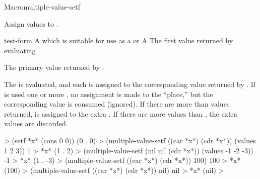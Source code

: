 \documentclass[10pt,twoside,english,pdftex]{article}
\begin{document}

\begin{functiondoc}{Macro}{multiple-value-setf}{%
 }
  
\fnsyntax

\fnpurpose Assign values to .

\fnpackage {}

\fnmodule {}

\fnargs
\begin{args}{test-form}
\arg[place] A  which is suitable for use as a
   or \nil 
\arg[form] A 
 The first value returned by evaluating 
\end{args}

\fnreturns The primary value returned by .

\fndescription
% 
The  is evaluated, and each  is assigned to the
corresponding value returned by .  If \nil{} is used one or more
, no assignment is made to the \nil{} ``place,'' but the
corresponding value is consumed (ignored). If there are more 
than values returned, \nil{} is assigned to the extra . If there
are more values than , the extra values are discarded.

\fnexamples
%
\W\supp
\begin{example}
  > (setf *x* (cons 0 0))
  (0 . 0)
  > (multiple-value-setf ((car *x*) (cdr *x*)) (values 1 2 3))
  1
  > *x*
  (1 . 2)\goodpagebreak
  > (multiple-value-setf (nil nil (cdr *x*)) (values -1 -2 -3))
  -1
  > *x*
  (1 . -3)\goodpagebreak
  > (multiple-value-setf ((car *x*) (cdr *x*)) 100)
  100
  > *x*
  (100)\goodpagebreak
  > (multiple-value-setf ((car *x*) (cdr *x*)) nil)
  nil
  > *x*
  (nil)\goodpagebreak
>
\end{example}

\end{functiondoc}

\end{document}
